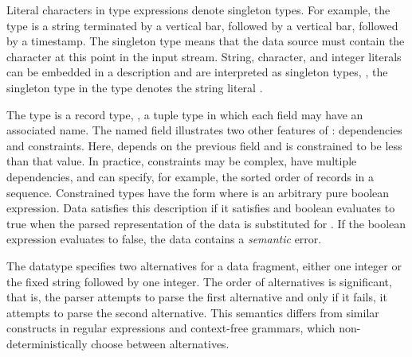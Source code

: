 Literal characters in type expressions denote singleton types.  For
example, the  type is a string terminated by a
vertical bar, followed by a vertical bar, followed by a timestamp.  The
singleton type  means that the data source must contain the
character  at this point in the input stream.  String,
character, and integer literals can be embedded in a description and
are interpreted as singleton types, \eg{}, the singleton type
 in the  type
denotes the string literal .

The type  is a record type, \ie{}, a tuple type in
which each field may have an associated name.  The named field
 illustrates two other features of
\padsml: dependencies and constraints.  Here, 
depends on the previous field  and is constrained to be
less than that value.  In practice, constraints may be complex, have
multiple dependencies, and can specify, for example, the sorted order
of records in a sequence.  Constrained types have the form \cd{[x:T |
e]} where  is an arbitrary pure boolean expression.  Data
satisfies this description if it satisfies  and boolean 
evaluates to true when the parsed representation of the data is
substituted for .  If the boolean expression evaluates to false,
the data contains a \textit{semantic} error.

The datatype  specifies two
alternatives for a data fragment, either one integer or the fixed
string  followed by one integer.  The order of
alternatives is significant, that is, the parser attempts to parse the
first alternative and only if it fails, it attempts to parse the
second alternative.  This semantics differs from similar constructs in
regular expressions and context-free grammars, which
non-deterministically choose between alternatives.


